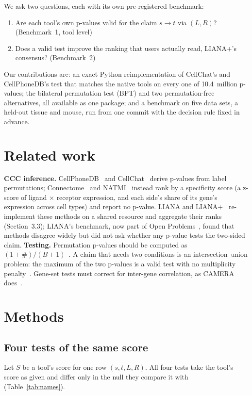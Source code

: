 \documentclass[11pt]{article}
\newcommand{\BPT}{BPT}
\newcommand{\st}{$s\!\to\!t$}
\begin{document}
We ask two questions, each with its own pre-registered benchmark:
\begin{enumerate}\setlength{\itemsep}{0pt}
  \item Are each tool's own p-values valid for the claim \st{} via $(L,R)$? (Benchmark~1, tool level)
  \item Does a valid test improve the ranking that users actually read, LIANA+'s consensus? (Benchmark~2)
\end{enumerate}
Our contributions are: an exact Python reimplementation of CellChat's and CellPhoneDB's test that matches the native
tools on every one of 10.4~million p-values; the bilateral permutation test (\BPT) and two permutation-free
alternatives, all available as one package; and a benchmark on five data sets, a held-out tissue and mouse, run from
one commit with the decision rule fixed in advance.

\section{Related work}

\textbf{CCC inference.} CellPhoneDB~\cite{efremova2020} and CellChat~\cite{jin2021} derive p-values from label
permutations; Connectome~\cite{raredon2022} and NATMI~\cite{hou2020} instead rank by a specificity score (a z-score of
ligand $\times$ receptor expression, and each side's share of its gene's expression across cell types) and report no
p-value. LIANA and LIANA+~\cite{dimitrov2022,dimitrov2024} re-implement these methods on a shared resource and
aggregate their ranks (Section~3.3); LIANA's benchmark, now part of Open
Problems~\cite{openproblems}, found that methods disagree widely but did not ask whether any p-value tests the
two-sided claim. \textbf{Testing.} Permutation p-values should be computed as $(1+\#)/(B+1)$~\cite{phipson2010}. A
claim that needs two conditions is an intersection--union problem: the maximum of the two p-values is a valid test
with no multiplicity penalty~\cite{berger1982}. Gene-set tests must correct for inter-gene
correlation, as CAMERA does~\cite{wu2012}.

\section{Methods}

\subsection{Four tests of the same score}
Let $S$ be a tool's score for one row $(s,t,L,R)$. All four tests take the tool's score as given and differ only in
the null they compare it with (Table~\ref{tab:names}).
\end{document}
